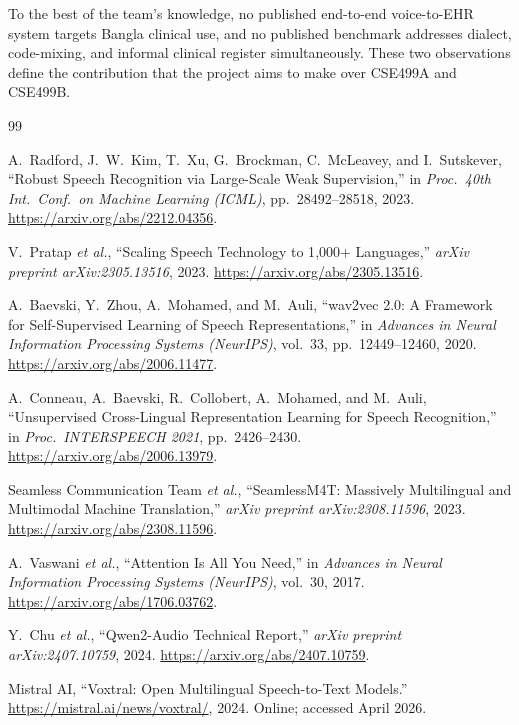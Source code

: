 \documentclass[12pt,a4paper]{article}
\begin{document}
To the best of the team's knowledge, no published end-to-end
voice-to-EHR system targets Bangla clinical use, and no published
benchmark addresses dialect, code-mixing, and informal clinical
register simultaneously. These two observations define the
contribution that the project aims to make over CSE499A and
CSE499B.

\begin{thebibliography}{99}

A.~Radford, J.~W.~Kim, T.~Xu, G.~Brockman, C.~McLeavey,
and I.~Sutskever,
``Robust Speech Recognition via Large-Scale Weak Supervision,''
in \emph{Proc.\ 40th Int.\ Conf.\ on Machine Learning (ICML)},
pp.~28492--28518, 2023.
\url{https://arxiv.org/abs/2212.04356}.

V.~Pratap \emph{et al.},
``Scaling Speech Technology to 1{,}000+ Languages,''
\emph{arXiv preprint arXiv:2305.13516}, 2023.
\url{https://arxiv.org/abs/2305.13516}.

A.~Baevski, Y.~Zhou, A.~Mohamed, and M.~Auli,
``wav2vec 2.0: A Framework for Self-Supervised Learning of Speech
Representations,''
in \emph{Advances in Neural Information Processing Systems
(NeurIPS)}, vol.~33, pp.~12449--12460, 2020.
\url{https://arxiv.org/abs/2006.11477}.

A.~Conneau, A.~Baevski, R.~Collobert, A.~Mohamed, and M.~Auli,
``Unsupervised Cross-Lingual Representation Learning for Speech
Recognition,''
in \emph{Proc.\ INTERSPEECH 2021}, pp.~2426--2430.
\url{https://arxiv.org/abs/2006.13979}.

Seamless Communication Team \emph{et al.},
``SeamlessM4T: Massively Multilingual and Multimodal Machine
Translation,''
\emph{arXiv preprint arXiv:2308.11596}, 2023.
\url{https://arxiv.org/abs/2308.11596}.

A.~Vaswani \emph{et al.},
``Attention Is All You Need,''
in \emph{Advances in Neural Information Processing Systems
(NeurIPS)}, vol.~30, 2017.
\url{https://arxiv.org/abs/1706.03762}.

Y.~Chu \emph{et al.},
``Qwen2-Audio Technical Report,''
\emph{arXiv preprint arXiv:2407.10759}, 2024.
\url{https://arxiv.org/abs/2407.10759}.

Mistral AI,
``Voxtral: Open Multilingual Speech-to-Text Models.''
\url{https://mistral.ai/news/voxtral/},
2024. Online; accessed April 2026.


\end{thebibliography}
\end{document}
